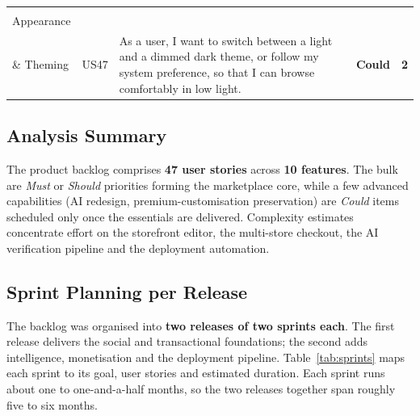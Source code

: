 \begin{longtable}{|>{\centering\arraybackslash\small}p{2.2cm}|>{\centering\arraybackslash\small}p{0.9cm}|>{\small}p{7.4cm}|>{\centering\arraybackslash\small}p{1.3cm}|>{\centering\arraybackslash\small}p{0.6cm}|}
  \cellcolor{featTheme}\makecell[c]{\textbf{F10}\\\small Appearance\\\& Theming}
  & US47 & As a user, I want to switch between a light and a dimmed dark theme, or follow my system preference, so that I can browse comfortably in low light. & \cellcolor{moscowCould}\textbf{Could} & \cellcolor{complexMed}\textbf{2} \\\hline

\end{longtable}

\subsection{Analysis Summary}

The product backlog comprises \textbf{47 user stories} across
\textbf{10 features}. The bulk are \textit{Must} or \textit{Should}
priorities forming the marketplace core, while a few advanced
capabilities (AI redesign, premium-customisation preservation) are
\textit{Could} items scheduled only once the essentials are delivered.
Complexity estimates concentrate effort on the storefront editor, the
multi-store checkout, the AI verification pipeline and the deployment
automation.

\subsection{Sprint Planning per Release}

The backlog was organised into \textbf{two releases of two sprints
each}. The first release delivers the social and transactional
foundations; the second adds intelligence, monetisation and the
deployment pipeline. Table~\ref{tab:sprints} maps each sprint to its
goal, user stories and estimated duration. Each sprint runs about one to
one-and-a-half months, so the two releases together span roughly five to
six months.


